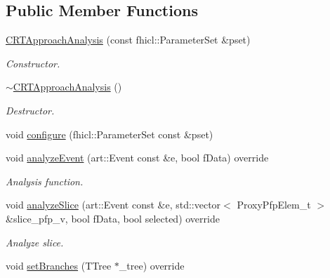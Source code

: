 \subsection*{Public Member Functions}
\begin{DoxyCompactItemize}
\item 
\hyperlink{classanalysis_1_1CRTApproachAnalysis_a15b3a1fc6bdd4cea8e96d604ea40e061}{C\-R\-T\-Approach\-Analysis} (const fhicl\-::\-Parameter\-Set \&pset)
\begin{DoxyCompactList}\small\item\em Constructor. \end{DoxyCompactList}\item 
\hypertarget{classanalysis_1_1CRTApproachAnalysis_a4a25552da3eaba21e3d17b78d10c4bce}{\hyperlink{classanalysis_1_1CRTApproachAnalysis_a4a25552da3eaba21e3d17b78d10c4bce}{$\sim$\-C\-R\-T\-Approach\-Analysis} ()}\label{classanalysis_1_1CRTApproachAnalysis_a4a25552da3eaba21e3d17b78d10c4bce}

\begin{DoxyCompactList}\small\item\em Destructor. \end{DoxyCompactList}\item 
void \hyperlink{classanalysis_1_1CRTApproachAnalysis_a6e86e8f45b26d8712cd5749b2e983a10}{configure} (fhicl\-::\-Parameter\-Set const \&pset)
\item 
\hypertarget{classanalysis_1_1CRTApproachAnalysis_ad367db2555c9f7b34b9854e3e21bf9ca}{void \hyperlink{classanalysis_1_1CRTApproachAnalysis_ad367db2555c9f7b34b9854e3e21bf9ca}{analyze\-Event} (art\-::\-Event const \&e, bool f\-Data) override}\label{classanalysis_1_1CRTApproachAnalysis_ad367db2555c9f7b34b9854e3e21bf9ca}

\begin{DoxyCompactList}\small\item\em Analysis function. \end{DoxyCompactList}\item 
\hypertarget{classanalysis_1_1CRTApproachAnalysis_a1ec2e53aa488645ad8c7ba625699d394}{void \hyperlink{classanalysis_1_1CRTApproachAnalysis_a1ec2e53aa488645ad8c7ba625699d394}{analyze\-Slice} (art\-::\-Event const \&e, std\-::vector$<$ Proxy\-Pfp\-Elem\-\_\-t $>$ \&slice\-\_\-pfp\-\_\-v, bool f\-Data, bool selected) override}\label{classanalysis_1_1CRTApproachAnalysis_a1ec2e53aa488645ad8c7ba625699d394}

\begin{DoxyCompactList}\small\item\em Analyze slice. \end{DoxyCompactList}\item 
\hypertarget{classanalysis_1_1CRTApproachAnalysis_a457c95415578481a7c92b6b676b39550}{void \hyperlink{classanalysis_1_1CRTApproachAnalysis_a457c95415578481a7c92b6b676b39550}{set\-Branches} (T\-Tree $\ast$\-\_\-tree) override}\label{classanalysis_1_1CRTApproachAnalysis_a457c95415578481a7c92b6b676b39550}


\end{DoxyCompactItemize}
